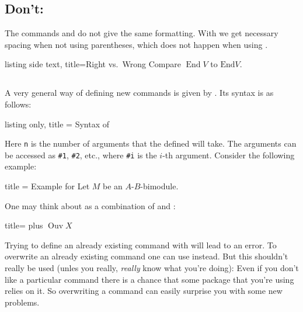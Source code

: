 \documentclass[a4paper, 10pt, headings=standardclasses, oneside, bibliography=totocnumbered]{scrbook}
\begin{document}
\subsection{Don’t: }

The commands  and  do not give the same formatting.
With  we get necessary spacing when not using parentheses, which does not happen when using .
\begin{tcblisting}{listing side text, title={Right vs.\ Wrong}}
Compare $\operatorname{End} V$ to $\mathrm{End} V$.
\end{tcblisting}





\subsection{}

A very general way of defining new commands is given by .
Its syntax is as follows:
\begin{tcblisting}{listing only, title = {Syntax of }}
\newcommand{\name}[n]{ definition including #1, ..., #n }
\end{tcblisting}
Here \texttt{n} is the number of arguments that the defined  will take.
The arguments can be accessed as \texttt{\#1}, \texttt{\#2}, etc., where \texttt{\#i} is the $i$-th argument.
Consider the following example:
\begin{tcblisting}{title = {Example for }}
\newcommand{\bimodule}[2]{#1-#2-bimodule}
Let $M$ be an \bimodule{$A$}{$B$}.
\end{tcblisting}
One may think about  as a combination of  and :
\begin{tcblisting}{title={ plus }}
\newcommand{\Ouv}{\operatorname{Ouv}}
$\Ouv X$
\end{tcblisting}

Trying to define an already existing command with  will lead to an error.
To overwrite an already existing command one can use  instead.
But this shouldn’t really be used (unles you really, \emph{really} know what you’re doing):
Even if you don’t like a particular command there is a chance that some package that you’re using relies on it.
So overwriting a command can easily surprise you with some new problems.
\end{document}
